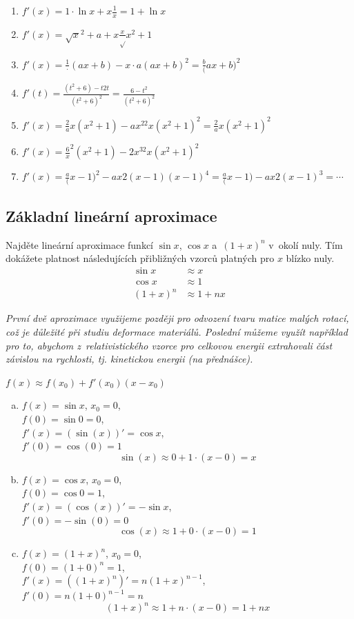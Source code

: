 \def\der#1.{$f'(x)=#1$}
\reseni
  \begin{enumerate}
  \item \der 1\cdot \ln x+x\frac 1x=1+\ln x.
  \item \der \sqrt{x^2+a}+x\frac{x}{\sqrt{x^2+1}}.
  \item \der \frac{1\cdot (ax+b)-x\cdot a}{(ax+b)^2}=\frac b{(ax+b)^2}.
  \item $f'(t)=\frac{(t^2+6)-t2t}{(t^2+6)^2}=\frac{6-t^2}{(t^2+6)^2}$
  \item \der \frac {2ax(x^2+1)-ax^22x}{(x^2+1)^2}=\frac {2ax}{(x^2+1)^2}.
  \item \der \frac {6x^2(x^2+1)-2x^32x}{(x^2+1)^2}.
  \item \der \frac{a(x-1)^2-ax2(x-1)}{(x-1)^4}= \frac{a(x-1)-ax2}{(x-1)^3}=\cdots.
  \end{enumerate}
\konec



\stranka


\subsection{Základní lineární aproximace}
Najděte lineární aproximace funkcí $\sin x$, $\cos x$ a~${(1+x)^n}$ v okolí nuly. Tím dokážete platnost následujících přibližných vzorců platných pro $x$ blízko nuly.
\begin{align*}
\sin x&\approx  x\\
\cos x&\approx  1\\
(1+x)^n&\approx  1+nx
\end{align*}

\textit{První dvě aproximace využijeme později pro odvození tvaru matice malých rotací, což je důležité při studiu deformace materiálů. Poslední můžeme využít například pro to, abychom z relativistického vzorce pro  celkovou energii extrahovali část závislou na rychlosti, tj. kinetickou energii (na přednášce).
}

\reseni

$f(x)\approx f(x_0)+f'(x_0)(x-x_0)$
\begin{enumerate}[a)]
\item $f(x)=\sin x$, $x_0=0$,\\ $f(0)=\sin 0=0$,\\ $f'(x)=(\sin(x))'=\cos x$,\\ $f'(0)=\cos (0)=1$
  $$\sin(x)\approx 0+1\cdot (x-0)=x$$
\item $f(x)=\cos x$, $x_0=0$,\\ $f(0)=\cos 0=1$,\\ $f'(x)=(\cos(x))'=-\sin x$,\\ $f'(0)=-\sin (0)=0$
  $$\cos(x)\approx 1+0\cdot (x-0)=1$$
\item $f(x)=(1+x)^n$, $x_0=0$,\\ $f(0)=(1+0)^n=1$,\\ $f'(x)=((1+x)^n)'=n(1+x)^{n-1}$,\\ $f'(0)=n(1+0)^{n-1}=n$
  $$(1+x)^n\approx 1+n\cdot (x-0)=1+nx$$
\end{enumerate}

